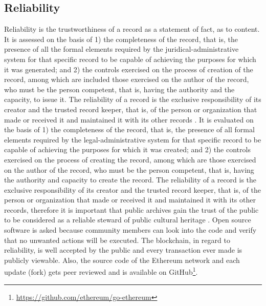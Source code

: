 \subsection{Reliability}
Reliability is the trustworthiness of a record as a statement of fact, as to content. It is assessed on the basis of 1) the completeness of the record, that is, the presence of all the formal elements required by the juridical-administrative system for that specific record to be capable of achieving the purposes for which it was generated; and 2) the controls exercised on the process of creation of the record, among which are included those exercised on the author of the record, who must be the person competent, that is, having the authority and the capacity, to issue it. The reliability of a record is the exclusive responsibility of its creator and the trusted record keeper, that is, of the person or organization that made or received it and maintained it with its other records \cite[52]{duranti2009digital}.
It is evaluated on the basis of 1) the completeness of the record, that is, the presence of all formal elements required by the legal-administrative system for that specific record to be capable of achieving the purposes for which it was created; and 2) the controls exercised on the process of creating the record, among which are those exercised on the author of the record, who must be the person competent, that is, having the authority and capacity to create the record. The reliability of a record is the exclusive responsibility of its creator and the trusted record keeper, that is, of the person or organization that made or received it and maintained it with its other records, therefore it is important that public archives gain the trust of the public to be considered as a reliable steward of public cultural heritage \cite[52]{duranti2009digital}.
Open source software is asked because community members can look into the code and verify that no unwanted actions will be executed. The blockchain, in regard to reliability, is well accepted by the public and every transaction ever made is publicly viewable. Also, the source code of the Ethereum network and each update (fork) gets peer reviewed and is available on GitHub\footnote{\url{https://github.com/ethereum/go-ethereum}}.


